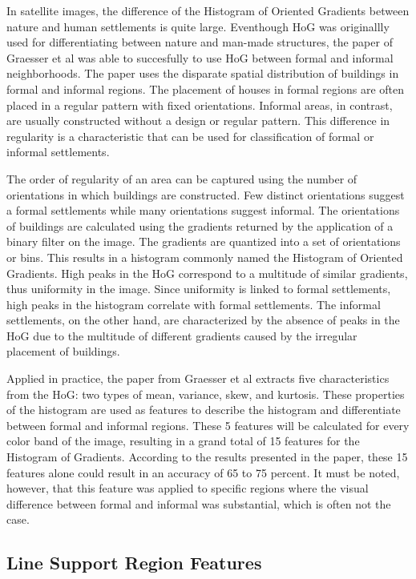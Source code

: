 In satellite images, the difference of the Histogram of Oriented Gradients
between nature and human settlements is quite large. Eventhough HoG was
originallly used for differentiating between nature and man-made structures,
the paper of Graesser et al was able to succesfully to use HoG between formal
and informal neighborhoods. The paper uses the disparate spatial distribution of
buildings in formal and informal regions. The
placement of houses in formal regions are often placed in a regular pattern
with fixed orientations. Informal areas, in contrast, are usually constructed
without a design or regular pattern. This difference in regularity is
a characteristic that can be used for classification of formal or informal
settlements.

The order of regularity of an area can be captured using the number of
orientations in which buildings are constructed. Few distinct orientations suggest
a formal settlements while many orientations suggest informal. The orientations
of buildings are calculated using the gradients returned by the application of
a binary filter on the image. The gradients are quantized into a set of
orientations or bins. This results in a histogram commonly named the Histogram
of Oriented Gradients. High peaks in the HoG correspond to a multitude of
similar gradients, thus uniformity in the image. Since uniformity is linked
to formal settlements, high peaks in the histogram correlate with formal
settlements. The informal settlements, on the other hand, are characterized by
the absence of peaks in the HoG due to the multitude of different gradients
caused by the irregular placement of buildings.

Applied in practice, the paper from Graesser et al extracts five
characteristics from the HoG: two types of mean, variance, skew, and
kurtosis. These properties of the histogram are used as features to
describe the histogram and differentiate between formal and informal regions.
These 5 features will be calculated for every color band of the image,
resulting in a grand total of 15 features for the Histogram of Gradients.
According to the results presented in the paper, these 15 features alone could
result in an accuracy of 65 to 75 percent. It must be noted, however, that this feature was applied to specific regions where the visual difference between formal and informal was substantial, which is often not the case.

\subsection{Line Support Region Features}

